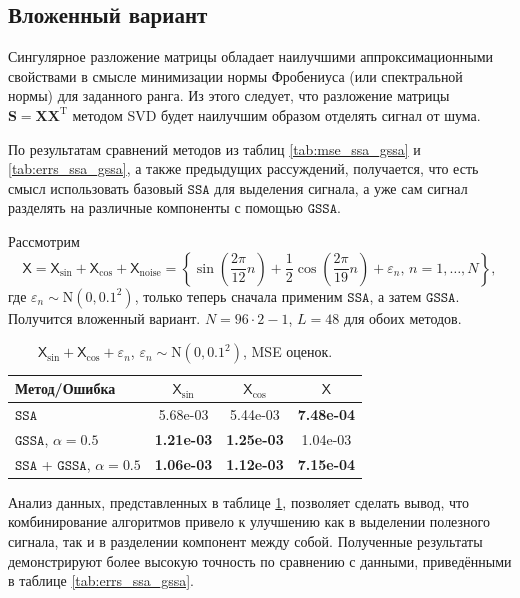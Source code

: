 \documentclass[12pt, specialist, subf
]{disser}
\theoremstyle{definition}
\newcommand{\SSA}{\texttt{SSA}}
\newcommand{\GSSA}{\texttt{GSSA}}
\newcommand{\TS}{\mathsf{X}}
\begin{document}
\subsection{Вложенный вариант}
Сингулярное разложение матрицы обладает наилучшими аппроксимационными свойствами в смысле минимизации нормы Фробениуса (или спектральной нормы) для заданного ранга. Из этого следует, что разложение матрицы $\mathbf{S} = \mathbf{X}\mathbf{X}^{\mathrm{T}}$ методом SVD будет наилучшим образом отделять сигнал от шума.

По результатам сравнений методов из таблиц \ref{tab:mse_ssa_gssa} и \ref{tab:errs_ssa_gssa}, а также предыдущих рассуждений, получается, что есть смысл использовать базовый $\SSA$ для выделения сигнала, а уже сам сигнал разделять на различные компоненты с помощью $\GSSA$.

Рассмотрим \[\TS = \TS_{\sin} + \TS_{\cos} + \TS_{\mathrm{noise}} =
	\left\{
	\sin\left(\frac{2\pi}{12}n\right) +
	\frac{1}{2}\cos\left(\frac{2\pi}{19}n\right)+
	\varepsilon_n, \,
	n = 1, \dots, N
	\right\}, \]
где $\varepsilon_n \sim \mathrm N(0, 0.1^2)$, только теперь сначала применим $\SSA$, а затем $\GSSA$. Получится вложенный вариант.
$N = 96 \cdot 2 - 1$, $L = 48$ для обоих методов.

\begin{table}[H]
	\centering
	\caption{$\TS_{\sin} + \TS_{\cos}+
			\varepsilon_n$, $\varepsilon_n \sim \mathrm N(0, 0.1^2)$, MSE оценок. }
	\label{tab:errs_ssa_gssa_unite}
	\begin{tabular}{l|ccc}
		\hline
		Метод/Ошибка                     & $\TS_{\sin}$      & $\TS_{\cos}$      & $\TS$             \\
		\hline
		$\SSA$                           & 5.68e-03          & 5.44e-03          & \textbf{7.48e-04} \\
		$\GSSA$, $\alpha = 0.5$          & \textbf{1.21e-03} & \textbf{1.25e-03} & 1.04e-03          \\
		\hline
		$\SSA$ + $\GSSA$, $\alpha = 0.5$ & \textbf{1.06e-03} & \textbf{1.12e-03} & \textbf{7.15e-04} \\
		\hline
	\end{tabular}
\end{table}

Анализ данных, представленных в таблице \ref{tab:errs_ssa_gssa_unite}, позволяет сделать вывод, что комбинирование алгоритмов привело к улучшению как в выделении полезного сигнала, так и в разделении компонент между собой. Полученные результаты демонстрируют более высокую точность по сравнению с данными, приведёнными в таблице \ref{tab:errs_ssa_gssa}.
\end{document}

